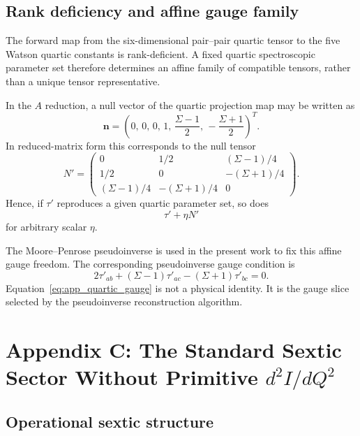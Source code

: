 \documentclass[aip,jcp,reprint,floatfix]{revtex4-2}
\begin{document}
\subsection{Rank deficiency and affine gauge family}

The forward map from the six-dimensional pair--pair quartic tensor to the five
Watson quartic constants is rank-deficient. A fixed quartic spectroscopic
parameter set therefore determines an affine family of compatible tensors,
rather than a unique tensor representative.

In the $A$ reduction, a null vector of the quartic projection map may be
written as
\begin{equation}
\mathbf n =
\left(
0,\,
0,\,
0,\,
1,\,
\frac{\Sigma-1}{2},\,
-\frac{\Sigma+1}{2}
\right)^T.
\end{equation}
In reduced-matrix form this corresponds to the null tensor
\begin{equation}
N'=
\begin{pmatrix}
0 & 1/2 & (\Sigma-1)/4 \\
1/2 & 0 & -(\Sigma+1)/4 \\
(\Sigma-1)/4 & -(\Sigma+1)/4 & 0
\end{pmatrix}.
\end{equation}
Hence, if $\tau'$ reproduces a given quartic parameter set, so does
\begin{equation}
\tau' + \eta N'
\end{equation}
for arbitrary scalar $\eta$.

The Moore--Penrose pseudoinverse is used in the present work to fix this affine
gauge freedom. The corresponding pseudoinverse gauge condition is
\begin{equation}
2\tau'_{ab}+(\Sigma-1)\tau'_{ac}-(\Sigma+1)\tau'_{bc}=0.
\label{eq:app_quartic_gauge}
\end{equation}
Equation~\eqref{eq:app_quartic_gauge} is not a physical identity. It is the
gauge slice selected by the pseudoinverse reconstruction algorithm.

\section{Appendix C: The Standard Sextic Sector Without Primitive \texorpdfstring{$d^2I/dQ^2$}{d2I/dQ2}}

\subsection{Operational sextic structure}
\end{document}
